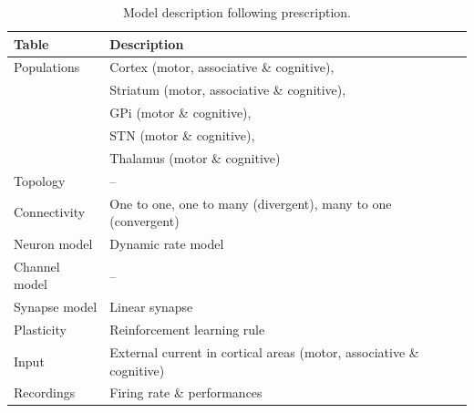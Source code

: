 \begin{table}[htbp]
  \small \sffamily \centering
  \begin{tabular}{ll}
\bf Table & \bf Description\\
\hline 
Populations & Cortex (motor, associative \& cognitive),\\
            & Striatum (motor, associative \& cognitive),\\
            & GPi (motor \& cognitive),\\
            & STN (motor \& cognitive),\\
            & Thalamus (motor \& cognitive)\\
Topology & --\\
Connectivity & One to one, one to many (divergent), many to one (convergent)\\
Neuron model & Dynamic rate model\\
Channel model & --\\
Synapse model & Linear synapse\\
Plasticity & Reinforcement learning rule\\
Input & External current in cortical areas (motor, associative \& cognitive)\\
Recordings & Firing rate \& performances\\
\hline
  \end{tabular}
\caption{Model description following \cite{Nordlie:2009} prescription.}
\end{table}


